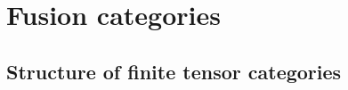         \minitoc
        
        
        
        
    
    \chapter{Fusion categories}
        \begin{abstract}
            
        \end{abstract}
        
        \minitoc
        
        
        
        
        
        
    
    \begin{appendices}
        \chapter{Structure of finite tensor categories}
            \begin{abstract}
            
            \end{abstract}
            
            \minitoc
        
            
            
            
        
    \end{appendices}
	
	\printbibliography

